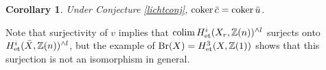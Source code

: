 \documentclass[nospthms,envcountsect]{svmult} %
\newtheorem{corollary}  [theorem]       {Corollary}
\begin{document}
\begin{corollary}
Under Conjecture \ref{lichtconj}, $\operatorname{coker} \bar c=\operatorname{coker} \bar u$.
\end{corollary} 

Note that surjectivity of $v$ implies that
$\colim H^i_\et(X_r,\Z(n))^{\wedge l}$ surjects onto
$H^i_{\text{\rm et}}(\bar X,{{\mathbb Z}}(n))^{\wedge l}$,
but the example of $\operatorname{Br}(X)=H^3_{\text{\rm et}}(X,{{\mathbb Z}}(1))$ shows that this surjection
is not an isomorphism in general.
\end{document}
